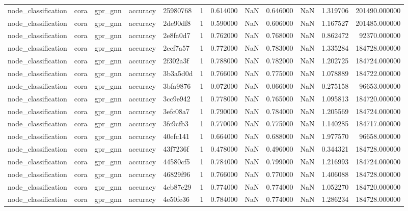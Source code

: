 \begin{tabular}{lllllrrrrrrr}
node_classification & cora & gpr_gnn & accuracy & 25980768 & 1 & 0.614000 & NaN & 0.646000 & NaN & 1.319706 & 201490.000000 \\
node_classification & cora & gpr_gnn & accuracy & 2de90df8 & 1 & 0.590000 & NaN & 0.606000 & NaN & 1.167527 & 201485.000000 \\
node_classification & cora & gpr_gnn & accuracy & 2e8fa0d7 & 1 & 0.762000 & NaN & 0.768000 & NaN & 0.862472 & 92370.000000 \\
node_classification & cora & gpr_gnn & accuracy & 2ecf7a57 & 1 & 0.772000 & NaN & 0.783000 & NaN & 1.335284 & 184728.000000 \\
node_classification & cora & gpr_gnn & accuracy & 2f302a3f & 1 & 0.788000 & NaN & 0.782000 & NaN & 1.202725 & 184724.000000 \\
node_classification & cora & gpr_gnn & accuracy & 3b3a5d0d & 1 & 0.766000 & NaN & 0.775000 & NaN & 1.078889 & 184722.000000 \\
node_classification & cora & gpr_gnn & accuracy & 3bfa9876 & 1 & 0.072000 & NaN & 0.066000 & NaN & 0.275158 & 96653.000000 \\
node_classification & cora & gpr_gnn & accuracy & 3cc9e942 & 1 & 0.778000 & NaN & 0.765000 & NaN & 1.095813 & 184720.000000 \\
node_classification & cora & gpr_gnn & accuracy & 3efc08a7 & 1 & 0.790000 & NaN & 0.784000 & NaN & 1.205569 & 184724.000000 \\
node_classification & cora & gpr_gnn & accuracy & 3fc9cfb3 & 1 & 0.770000 & NaN & 0.775000 & NaN & 1.140285 & 184717.000000 \\
node_classification & cora & gpr_gnn & accuracy & 40efc141 & 1 & 0.664000 & NaN & 0.688000 & NaN & 1.977570 & 96658.000000 \\
node_classification & cora & gpr_gnn & accuracy & 43f7236f & 1 & 0.478000 & NaN & 0.496000 & NaN & 0.344321 & 184728.000000 \\
node_classification & cora & gpr_gnn & accuracy & 44580cf5 & 1 & 0.784000 & NaN & 0.799000 & NaN & 1.216993 & 184724.000000 \\
node_classification & cora & gpr_gnn & accuracy & 46829f96 & 1 & 0.766000 & NaN & 0.770000 & NaN & 1.406088 & 184728.000000 \\
node_classification & cora & gpr_gnn & accuracy & 4cb87e29 & 1 & 0.774000 & NaN & 0.774000 & NaN & 1.052270 & 184720.000000 \\
node_classification & cora & gpr_gnn & accuracy & 4e50fe36 & 1 & 0.784000 & NaN & 0.774000 & NaN & 1.286234 & 184728.000000 \\

\end{tabular}
